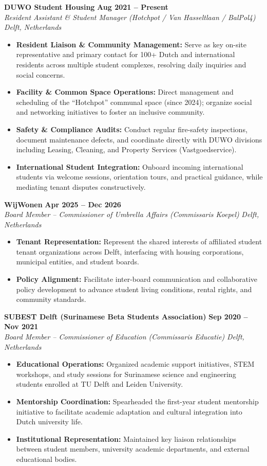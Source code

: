 \documentclass[letterpaper,11pt]{article}
\newcommand{\resumeSubheading}[4]{
  \vspace{-3pt}\item
    \textbf{\large#1} \hfill \textbf{\normalsize#2}\\
    \textit{\normalsize#3} \hfill \textit{\small#4}
  \vspace{-7pt}
}
\newcommand{\resumeItem}[1]{
  \item\normalsize{#1}
}
\newcommand{\resumeItemListStart}{\begin{itemize}[leftmargin=0.15in, topsep=0.5pt, itemsep=0.5pt, parsep=0pt]}
\newcommand{\resumeItemListEnd}{\end{itemize}}
\begin{document}
\resumeSubheading
{DUWO Student Housing}{Aug 2021 -- Present}
{Resident Assistant \& Student Manager (Hotchpot / Van Hasseltlaan / BalPol4)}{Delft, Netherlands}
\resumeItemListStart
\resumeItem{\textbf{Resident Liaison \& Community Management:} Serve as key on-site representative and primary contact for 100+ Dutch and international residents across multiple student complexes, resolving daily inquiries and social concerns.}
\resumeItem{\textbf{Facility \& Common Space Operations:} Direct management and scheduling of the ``Hotchpot'' communal space (since 2024); organize social and networking initiatives to foster an inclusive community.}
\resumeItem{\textbf{Safety \& Compliance Audits:} Conduct regular fire-safety inspections, document maintenance defects, and coordinate directly with DUWO divisions including Leasing, Cleaning, and Property Services (Vastgoedservice).}
\resumeItem{\textbf{International Student Integration:} Onboard incoming international students via welcome sessions, orientation tours, and practical guidance, while mediating tenant disputes constructively.}
\resumeItemListEnd
\vspace{-5pt}

\resumeSubheading
{WijWonen}{Apr 2025 -- Dec 2026}
{Board Member -- Commissioner of Umbrella Affairs (Commissaris Koepel)}{Delft, Netherlands}
\resumeItemListStart
\resumeItem{\textbf{Tenant Representation:} Represent the shared interests of affiliated student tenant organizations across Delft, interfacing with housing corporations, municipal entities, and student boards.}
\resumeItem{\textbf{Policy Alignment:} Facilitate inter-board communication and collaborative policy development to advance student living conditions, rental rights, and community standards.}
\resumeItemListEnd
\vspace{-5pt}

\resumeSubheading
{SUBEST Delft (Surinamese Beta Students Association)}{Sep 2020 -- Nov 2021}
{Board Member -- Commissioner of Education (Commissaris Educatie)}{Delft, Netherlands}
\resumeItemListStart
\resumeItem{\textbf{Educational Operations:} Organized academic support initiatives, STEM workshops, and study sessions for Surinamese science and engineering students enrolled at TU Delft and Leiden University.}
\resumeItem{\textbf{Mentorship Coordination:} Spearheaded the first-year student mentorship initiative to facilitate academic adaptation and cultural integration into Dutch university life.}
\resumeItem{\textbf{Institutional Representation:} Maintained key liaison relationships between student members, university academic departments, and external educational bodies.}
\resumeItemListEnd
\end{document}
